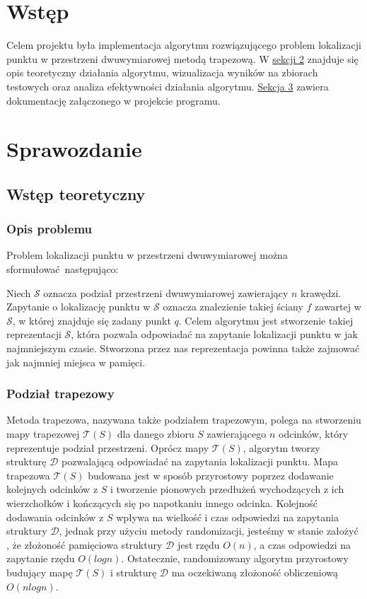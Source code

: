 \documentclass[11pt,a4paper]{article}
\begin{document}
\section{Wstęp}
Celem projektu była implementacja algorytmu rozwiązującego
problem lokalizacji punktu w przestrzeni dwuwymiarowej 
metodą trapezową. W \hyperlink{section.2}{sekcji 2} znajduje się opis teoretyczny
działania algorytmu, wizualizacja wyników na zbiorach testowych
oraz analiza efektywności działania algorytmu. 
\hyperlink{section.3}{Sekcja 3} zawiera dokumentację załączonego w projekcie programu.

\section{Sprawozdanie}

\subsection{Wstęp teoretyczny}

\subsubsection{Opis problemu}
Problem lokalizacji punktu w przestrzeni dwuwymiarowej
można sformułować następująco:

Niech $\mathscr{S}$ oznacza podział przestrzeni dwuwymiarowej
zawierający $n$ krawędzi. Zapytanie o lokalizację punktu w $\mathscr{S}$
oznacza znalezienie takiej ściany $f$ zawartej w $\mathscr{S}$,
w której znajduje się zadany punkt $q$. Celem algorytmu jest
stworzenie takiej reprezentacji $\mathscr{S}$, która pozwala
odpowiadać na zapytanie lokalizacji punktu w jak najmniejszym
czasie. Stworzona przez nas reprezentacja powinna także 
zajmować jak najmniej miejsca w pamięci.

\subsubsection{Podział trapezowy}
Metoda trapezowa, nazywana także podziałem trapezowym,
polega na stworzeniu mapy trapezowej $\mathscr{T}(S)$
dla danego zbioru $S$ zawierającego $n$ odcinków, który
reprezentuje podział przestrzeni. Oprócz mapy $\mathscr{T}(S)$,
algorytm tworzy strukturę $\mathscr{D}$ pozwalającą odpowiadać
na zapytania lokalizacji punktu. Mapa trapezowa $\mathscr{T}(S)$
budowana jest w sposób przyrostowy poprzez dodawanie
kolejnych odcinków z $S$ i tworzenie pionowych przedłużeń wychodzących 
z ich wierzchołków i kończących się po napotkaniu innego odcinka.
Kolejność dodawania odcinków z $S$ wpływa na wielkość 
i czas odpowiedzi na zapytania struktury $\mathscr{D}$, 
jednak przy użyciu metody randomizacji, jesteśmy w stanie 
założyć \cite[s. 133-136]{compgeo}, że złożoność pamięciowa 
struktury $\mathscr{D}$ jest rzędu $O(n)$, a czas odpowiedzi 
na zapytanie rzędu $O(logn)$.
Ostatecznie, randomizowany algorytm przyrostowy budujący mapę
$\mathscr{T}(S)$ i strukturę $\mathscr{D}$ ma oczekiwaną 
złożoność obliczeniową $O(nlogn)$.
\end{document}
